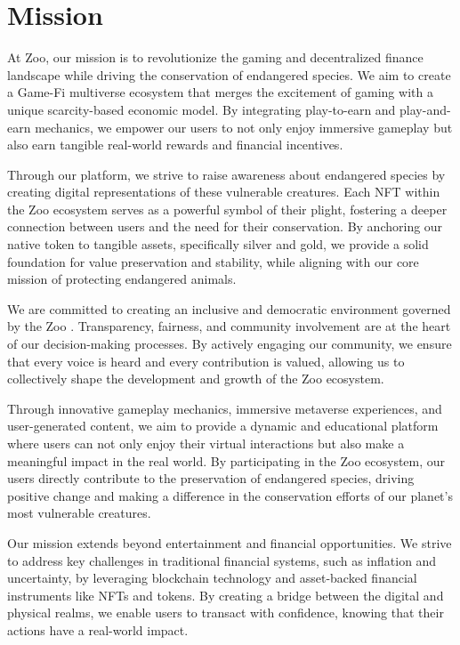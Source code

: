\section{Mission}

At Zoo, our mission is to revolutionize the gaming and decentralized finance landscape while driving the conservation of endangered species. We aim to create a Game-Fi multiverse ecosystem that merges the excitement of gaming with a unique scarcity-based economic model. By integrating play-to-earn and play-and-earn mechanics, we empower our users to not only enjoy immersive gameplay but also earn tangible real-world rewards and financial incentives.

Through our platform, we strive to raise awareness about endangered species by creating digital representations of these vulnerable creatures. Each NFT within the Zoo ecosystem serves as a powerful symbol of their plight, fostering a deeper connection between users and the need for their conservation. By anchoring our native token to tangible assets, specifically silver and gold, we provide a solid foundation for value preservation and stability, while aligning with our core mission of protecting endangered animals.

We are committed to creating an inclusive and democratic environment governed by the Zoo \DAO{}. Transparency, fairness, and community involvement are at the heart of our decision-making processes. By actively engaging our community, we ensure that every voice is heard and every contribution is valued, allowing us to collectively shape the development and growth of the Zoo ecosystem.

Through innovative gameplay mechanics, immersive metaverse experiences, and user-generated content, we aim to provide a dynamic and educational platform where users can not only enjoy their virtual interactions but also make a meaningful impact in the real world. By participating in the Zoo ecosystem, our users directly contribute to the preservation of endangered species, driving positive change and making a difference in the conservation efforts of our planet's most vulnerable creatures.

Our mission extends beyond entertainment and financial opportunities. We strive to address key challenges in traditional financial systems, such as inflation and uncertainty, by leveraging blockchain technology and asset-backed financial instruments like NFTs and tokens. By creating a bridge between the digital and physical realms, we enable users to transact with confidence, knowing that their actions have a real-world impact.
